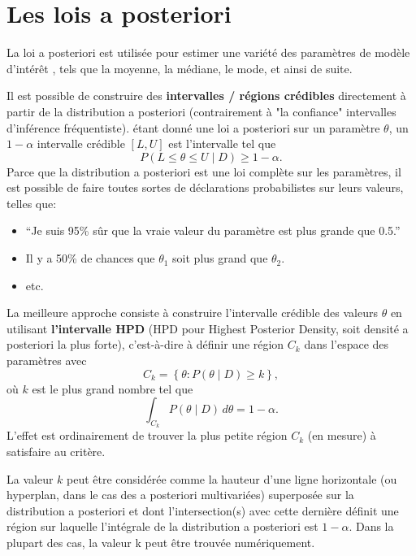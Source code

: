 

\section{Les lois a posteriori}
La loi a posteriori est utilis\'ee pour estimer une vari\'et\'e des param\`etres de mod\`ele d'int\'erêt , tels que la moyenne, la m\'ediane, le mode, et ainsi de suite. \par Il est possible de construire des \textbf{intervalles / r\'egions cr\'edibles} directement \`a partir de la distribution a posteriori (contrairement \`a "la confiance" intervalles d'inf\'erence fr\'equentiste).
\newl \'etant donn\'e une loi a posteriori sur un param\`etre $\theta$, un $1-\alpha$ intervalle cr\'edible $[L,U]$  est l'intervalle tel que 
$$ P(L \leq \theta \leq U\mid D)\geq 1-\alpha.$$
Parce que la distribution a posteriori est une loi compl\`ete sur les param\`etres, il est possible de faire toutes sortes de d\'eclarations probabilistes sur leurs valeurs, telles que:
\begin{itemize}[noitemsep]
	\item ``Je suis 95\% sûr que la vraie valeur du param\`etre est plus grande que 0.5.''
	\item Il y a 50\% de chances que $\theta_1$ soit plus grand que $\theta_2$.
  \item etc.
\end{itemize}
La meilleure approche consiste \`a construire l'intervalle cr\'edible des valeurs $\theta$ en utilisant \textbf{l'intervalle HPD}
(HPD pour Highest Posterior
Density, soit densit\'e a posteriori la plus forte), c'est-\`a-dire \`a d\'efinir une r\'egion $C_k$ dans l'espace des param\`etres avec
$$ C_k = \left\{\theta: P(\theta\mid D)\geq k\right\},$$
où $k$ est le plus grand nombre tel que
$$ \int_{C_k} P(\theta\mid D)\, d\theta = 1-\alpha.$$
L'effet est ordinairement de trouver la plus petite r\'egion $C_k$ (en mesure) \`a satisfaire au crit\`ere. \par La valeur $k$ peut être consid\'er\'ee comme la hauteur d'une ligne horizontale (ou hyperplan, dans le cas des a posteriori multivari\'ees) superpos\'ee sur la distribution a posteriori et dont l'intersection(s) avec cette derni\`ere d\'efinit une r\'egion sur laquelle l'int\'egrale de la distribution a posteriori est $1-\alpha$. Dans la plupart des cas, la valeur k peut être trouv\'ee num\'eriquement. 
